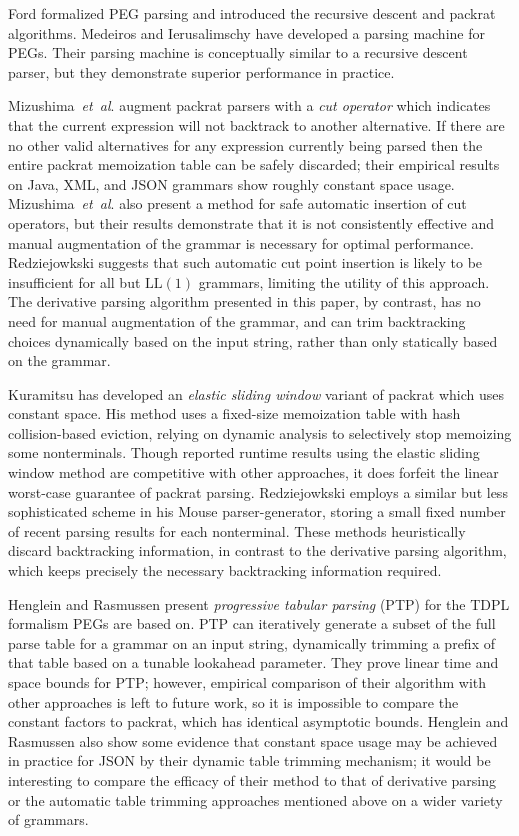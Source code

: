 \documentclass[submission,copyright,creativecommons]{eptcs}
\newcommand{\etal}{\textit{et~al}. }
\begin{document}
Ford \cite{For02} formalized PEG parsing and introduced the recursive descent and packrat algorithms. 
Medeiros and Ierusalimschy \cite{MI08} have developed a parsing machine for PEGs.
Their parsing machine is conceptually similar to a recursive descent parser, but they demonstrate superior performance in practice.

Mizushima~\etal \cite{MMY10} augment packrat parsers with a \emph{cut operator} which indicates that the current expression will not backtrack to another alternative. 
If there are no other valid alternatives for any expression currently being parsed then the entire packrat memoization table can be safely discarded; their empirical results on Java, XML, and JSON grammars show roughly constant space usage.
Mizushima~\etal{} also present a method for safe automatic insertion of cut operators, but their results demonstrate that it is not consistently effective and manual augmentation of the grammar is necessary for optimal performance.
Redziejowkski \cite{Red16} suggests that such automatic cut point insertion is likely to be insufficient for all but $\mathrm{LL}(1)$ grammars, limiting the utility of this approach.
The derivative parsing algorithm presented in this paper, by contrast, has no need for manual augmentation of the grammar, and can trim backtracking choices dynamically based on the input string, rather than only statically based on the grammar.

Kuramitsu \cite{Kur15} has developed an \emph{elastic sliding window} variant of packrat which uses constant space.
His method uses a fixed-size memoization table with hash collision-based eviction, relying on dynamic analysis to selectively stop memoizing some nonterminals.
Though reported runtime results using the elastic sliding window method are competitive with other approaches, it does forfeit the linear worst-case guarantee of packrat parsing.
Redziejowkski \cite{Red07} employs a similar but less sophisticated scheme in his Mouse parser-generator, storing a small fixed number of recent parsing results for each nonterminal. 
These methods heuristically discard backtracking information, in contrast to the derivative parsing algorithm, which keeps precisely the necessary backtracking information required.

Henglein and Rasmussen \cite{HR17} present \emph{progressive tabular parsing} (PTP) for the TDPL formalism PEGs are based on. 
PTP can iteratively generate a subset of the full parse table for a grammar on an input string, dynamically trimming a prefix of that table based on a tunable lookahead parameter. 
They prove linear time and space bounds for PTP; however, empirical comparison of their algorithm with other approaches is left to future work, so it is impossible to compare the constant factors to packrat, which has identical asymptotic bounds.
Henglein and Rasmussen also show some evidence that constant space usage may be achieved in practice for JSON by their dynamic table trimming mechanism; it would be interesting to compare the efficacy of their method to that of derivative parsing or the automatic table trimming approaches mentioned above on a wider variety of grammars.
\end{document}
